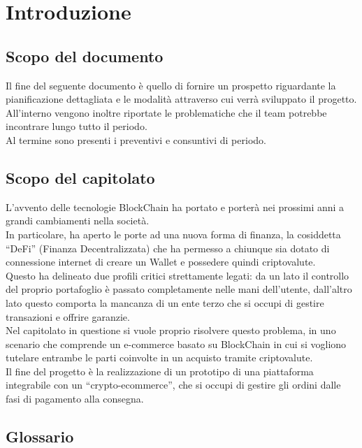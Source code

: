 \section{Introduzione} \label{section:introduzione}

\subsection{Scopo del documento} \label{subsection:intro_scopo_documento}
Il fine del seguente documento è quello di fornire un prospetto riguardante la pianificazione dettagliata e le modalità attraverso cui verrà sviluppato il progetto.\\
All'interno vengono inoltre riportate le problematiche che il team potrebbe incontrare lungo tutto il periodo.\\
Al termine sono presenti i preventivi e consuntivi di periodo.

\subsection{Scopo del capitolato} \label{subsection:intro_scopo_capitolato}
L'avvento delle tecnologie BlockChain\glo{} ha portato e porterà nei prossimi anni a grandi cambiamenti nella società.\\
In particolare, ha aperto le porte ad una nuova forma di finanza, la cosiddetta “DeFi” (Finanza Decentralizzata) che ha permesso a chiunque sia dotato di connessione
 internet di creare un Wallet\glo{} e possedere quindi criptovalute\glo{}.\\
Questo ha delineato due profili critici strettamente legati: da un lato il controllo del proprio portafoglio è passato completamente nelle mani dell'utente, 
dall'altro lato questo comporta la mancanza di un ente terzo che si occupi di gestire transazioni e offrire garanzie.\\
Nel capitolato in questione si vuole proprio risolvere questo problema, in uno scenario che comprende un e-commerce\glo{} basato su BlockChain\glo{} in cui si 
vogliono tutelare entrambe le parti coinvolte in un acquisto tramite criptovalute.\\
Il fine del progetto è la realizzazione di un prototipo di una piattaforma integrabile con un “crypto-ecommerce”\glo{}, che si occupi di gestire gli ordini dalle 
fasi di pagamento alla consegna.

\subsection{Glossario} \label{subsection:intro_glossario}
\gloDesc


